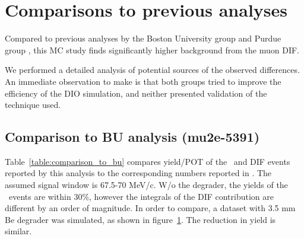 \section{Comparisons to previous analyses}

Compared to previous analyses by the Boston University group \cite{MU2E_5391_PIPLUSENU}
and Purdue group \cite{MU2E_48165_PIPLUSENU}, this MC study finds significantly higher
background from the muon DIF.

We performed a detailed analysis of potential sources of the observed differences.
%
An immediate observation to make is that both groups tried to improve the efficiency
of the DIO simulation, and neither presented validation of the technique used.

\subsection{Comparison to BU analysis (mu2e-5391) }

Table~\ref{table:comparison_to_bu} compares yield/POT of the \piplusenu\ and DIF events
reported by this analysis to the corresponding numbers reported in \cite{MU2E_5391_PIPLUSENU}.
The assumed signal window is 67.5-70 MeV/c.
W/o the degrader, the yields of the \piplusenu\ events are within 30\%,
however the integrals of the DIF contribution are different by an order of magnitude. In order to compare, a dataset with 3.5 mm Be degrader was simulated, as shown in figure~\ref{fig:bu_comparison}. The reduction in yield is similar.

\begin{figure}[H]
  \caption{
    \label{fig:bu_comparison}
  }
\end{figure}

